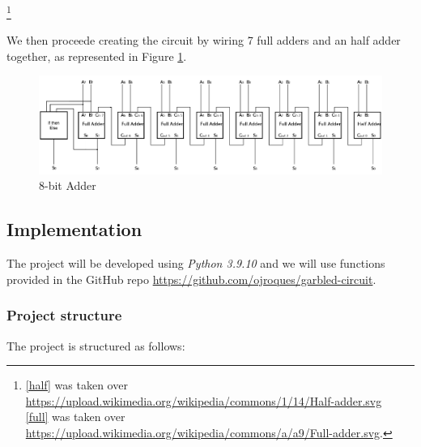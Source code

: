\documentclass[12pt]{article}
\begin{document}
\footnote{\ref{half} was taken over \url{https://upload.wikimedia.org/wikipedia/commons/1/14/Half-adder.svg}\\ 
\ref{full} was taken over \url{https://upload.wikimedia.org/wikipedia/commons/a/a9/Full-adder.svg}.}

We then proceede creating the circuit by wiring 7 full adders and an half adder together, as represented in Figure \ref{circuit}.

\begin{figure}[]
    \centering
    \includegraphics[width=1\linewidth]{../src/images/Circuit.png}
    \caption{8-bit Adder}\label{circuit}
\end{figure}

\subsection{Implementation}
The project will be developed using \textit{Python 3.9.10} and we will use functions provided in the GitHub repo \url{https://github.com/ojroques/garbled-circuit}.
\subsubsection{Project structure}
The project is structured as follows:



 
\end{document}
